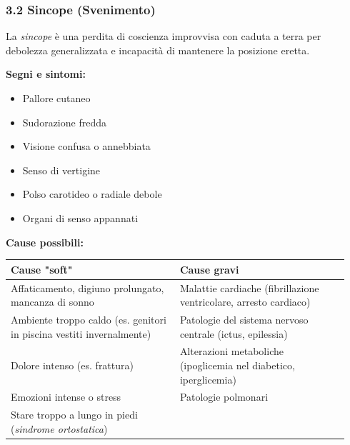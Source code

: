 \documentclass[a4paper,11pt]{article}
\providecommand{\tightlist}{%
  \setlength{\itemsep}{0pt}\setlength{\parskip}{0pt}}
\begin{document}
\subsubsection{3.2 Sincope (Svenimento)}\label{sincope-svenimento}

La \emph{sincope} è una perdita di coscienza improvvisa con caduta a
terra per debolezza generalizzata e incapacità di mantenere la posizione
eretta.

\textbf{Segni e sintomi:}

\begin{itemize}
      \tightlist
      \item
            Pallore cutaneo
      \item
            Sudorazione fredda
      \item
            Visione confusa o annebbiata
      \item
            Senso di vertigine
      \item
            Polso carotideo o radiale debole
      \item
            Organi di senso appannati
\end{itemize}

\textbf{Cause possibili:}

\begin{longtable}[]{@{}p{0.47\linewidth}p{0.47\linewidth}@{}}
      \toprule\noalign{}
      Cause "soft"                                                          & Cause gravi                              \\
      \midrule\noalign{}
      \endhead
      \bottomrule\noalign{}
      \endlastfoot
      Affaticamento, digiuno prolungato, mancanza di sonno                  & Malattie
      cardiache (fibrillazione ventricolare, arresto cardiaco)                                                         \\
      Ambiente troppo caldo (es. genitori in piscina vestiti invernalmente) &
      Patologie del sistema nervoso centrale (ictus, epilessia)                                                        \\
      Dolore intenso (es. frattura)                                         & Alterazioni metaboliche (ipoglicemia nel
      diabetico, iperglicemia)                                                                                         \\
      Emozioni intense o stress                                             & Patologie polmonari                      \\
      Stare troppo a lungo in piedi (\emph{sindrome ortostatica})           &                                          \\
\end{longtable}
\end{document}
